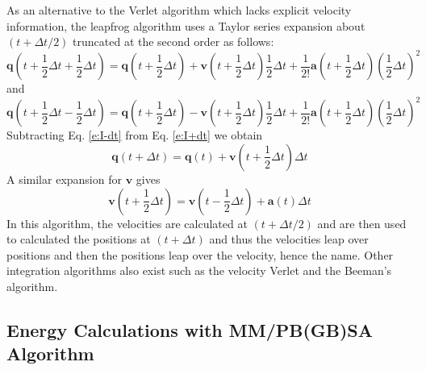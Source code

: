 \documentclass[11pt]{report}
\begin{document}
As an alternative to the Verlet algorithm which lacks
explicit velocity information, the leapfrog algorithm
uses a Taylor series expansion about $(t+\Delta t/2)$
truncated at the second order as follows:
\begin{equation}
\label{e:I+dt}
\mathbf{q}\left(t+\frac{1}{2}\Delta t+\frac{1}{2}\Delta t\right) = 
\mathbf{q}\left(t+\frac{1}{2}\Delta t\right) + \mathbf{v}\left(t+\frac{1}{2}\Delta t\right)\frac{1}{2} \Delta t + 
\frac{1}{2!} \mathbf{a}\left(t+\frac{1}{2}\Delta t\right) \left(\frac{1}{2}\Delta t\right)^2
\end{equation}
and
\begin{equation}
\label{e:I-dt}
\mathbf{q}\left(t+\frac{1}{2}\Delta t-\frac{1}{2}\Delta t\right) = 
\mathbf{q}\left(t+\frac{1}{2}\Delta t\right) - \mathbf{v}\left(t+\frac{1}{2}\Delta t\right)\frac{1}{2} \Delta t + 
\frac{1}{2!} \mathbf{a}\left(t+\frac{1}{2}\Delta t\right) \left(\frac{1}{2}\Delta t\right)^2
\end{equation}
Subtracting Eq. \ref{e:I-dt} from Eq. \ref{e:I+dt}
we obtain
\begin{equation}
\mathbf{q}\left(t+\Delta t \right) = 
\mathbf{q}(t) + \mathbf{v}\left(t + \frac{1}{2} \Delta t\right)
\Delta t
\end{equation}
A similar expansion for $\mathbf{v}$ gives
\begin{equation}
\mathbf{v}\left(t+\frac{1}{2}\Delta t \right) = 
\mathbf{v}\left(t-\frac{1}{2}\Delta t \right) + \mathbf{a}\left( t\right)
\Delta t
\end{equation}
In this algorithm, the velocities are calculated 
at $(t+\Delta t/2)$ and are then used
to calculated the positions at $(t+\Delta t)$
and thus the velocities leap over positions and
then the positions leap over the velocity, hence the name.
Other integration algorithms also exist such as the
velocity Verlet and the Beeman's algorithm.

\subsection{Energy Calculations with MM/PB(GB)SA Algorithm}
\end{document}
